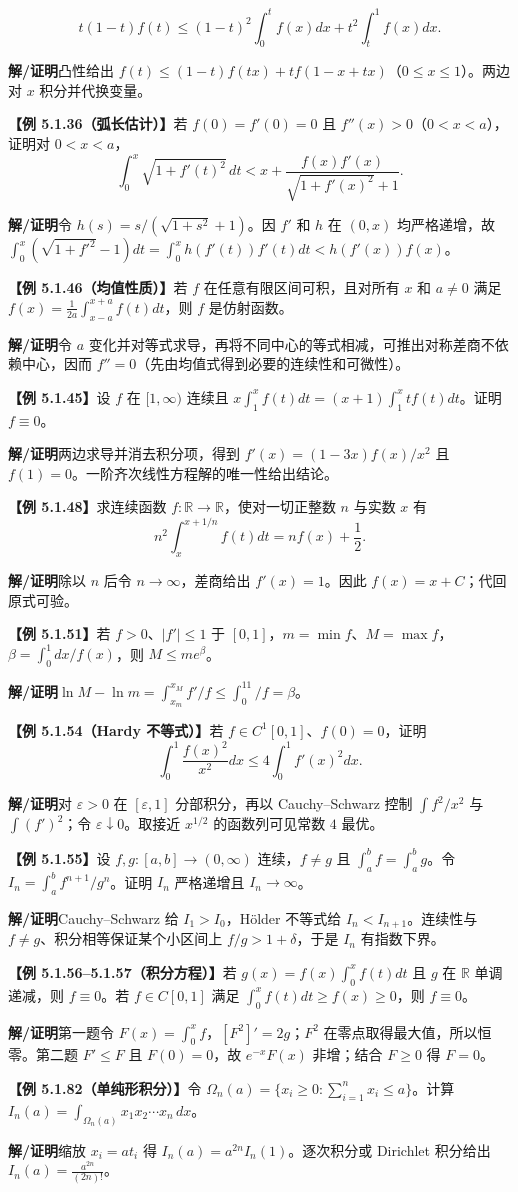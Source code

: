 \documentclass[UTF8,a4paper,11pt]{ctexart}
\newcommand{\ex}[1]{\par\medskip\noindent\textbf{【例 #1】}\;}
\newcommand{\sol}{\par\noindent\textbf{解/证明}\;}
\newcommand{\R}{\mathbb R}
\begin{document}
\[t(1-t)f(t)\le(1-t)^2\int_0^tf(x)dx+t^2\int_t^1f(x)dx.\]
\sol 凸性给出 $f(t)\le(1-t)f(tx)+tf(1-x+tx)$（$0\le x\le1$）。两边对 $x$ 积分并代换变量。
\ex{5.1.36（弧长估计）}若 $f(0)=f'(0)=0$ 且 $f''(x)>0$（$0<x<a$），证明对 $0<x<a$，
\[\int_0^x\sqrt{1+f'(t)^2}\,dt<x+\frac{f(x)f'(x)}{\sqrt{1+f'(x)^2}+1}.\]
\sol 令 $h(s)=s/(\sqrt{1+s^2}+1)$。因 $f'$ 和 $h$ 在 $(0,x)$ 均严格递增，故 $\int_0^x(\sqrt{1+f'^2}-1)dt=\int_0^xh(f'(t))f'(t)dt<h(f'(x))f(x)$。
\ex{5.1.46（均值性质）}若 $f$ 在任意有限区间可积，且对所有 $x$ 和 $a\ne0$ 满足 $f(x)=\frac1{2a}\int_{x-a}^{x+a}f(t)dt$，则 $f$ 是仿射函数。
\sol 令 $a$ 变化并对等式求导，再将不同中心的等式相减，可推出对称差商不依赖中心，因而 $f''=0$（先由均值式得到必要的连续性和可微性）。
\ex{5.1.45}设 $f$ 在 $[1,\infty)$ 连续且 $x\int_1^xf(t)dt=(x+1)\int_1^xtf(t)dt$。证明 $f\equiv0$。
\sol 两边求导并消去积分项，得到 $f'(x)=(1-3x)f(x)/x^2$ 且 $f(1)=0$。一阶齐次线性方程解的唯一性给出结论。
\ex{5.1.48}求连续函数 $f:\R\to\R$，使对一切正整数 $n$ 与实数 $x$ 有
\[n^2\int_x^{x+1/n}f(t)dt=nf(x)+\frac12.\]
\sol 除以 $n$ 后令 $n\to\infty$，差商给出 $f'(x)=1$。因此 $f(x)=x+C$；代回原式可验。
\ex{5.1.51}若 $f>0$、$|f'|\le1$ 于 $[0,1]$，$m=\min f$、$M=\max f$，$\beta=\int_0^1dx/f(x)$，则 $M\le me^\beta$。
\sol $\ln M-\ln m=\int_{x_m}^{x_M}f'/f\le\int_0^11/f=\beta$。
\ex{5.1.54（Hardy 不等式）}若 $f\in C^1[0,1]$、$f(0)=0$，证明
\[\int_0^1\frac{f(x)^2}{x^2}dx\le4\int_0^1f'(x)^2dx.\]
\sol 对 $\varepsilon>0$ 在 $[\varepsilon,1]$ 分部积分，再以 Cauchy--Schwarz 控制 $\int f^2/x^2$ 与 $\int(f')^2$；令 $\varepsilon\downarrow0$。取接近 $x^{1/2}$ 的函数列可见常数 $4$ 最优。
\ex{5.1.55}设 $f,g:[a,b]\to(0,\infty)$ 连续，$f\ne g$ 且 $\int_a^bf=\int_a^bg$。令 $I_n=\int_a^bf^{n+1}/g^n$。证明 $I_n$ 严格递增且 $I_n\to\infty$。
\sol Cauchy--Schwarz 给 $I_1>I_0$，Hölder 不等式给 $I_n<I_{n+1}$。连续性与 $f\ne g$、积分相等保证某个小区间上 $f/g>1+\delta$，于是 $I_n$ 有指数下界。
\ex{5.1.56--5.1.57（积分方程）}若 $g(x)=f(x)\int_0^xf(t)dt$ 且 $g$ 在 $\R$ 单调递减，则 $f\equiv0$。若 $f\in C[0,1]$ 满足 $\int_0^xf(t)dt\ge f(x)\ge0$，则 $f\equiv0$。
\sol 第一题令 $F(x)=\int_0^xf$，$[F^2]'=2g$；$F^2$ 在零点取得最大值，所以恒零。第二题 $F'\le F$ 且 $F(0)=0$，故 $e^{-x}F(x)$ 非增；结合 $F\ge0$ 得 $F=0$。
\ex{5.1.82（单纯形积分）}令 $\Omega_n(a)=\{x_i\ge0:\sum_{i=1}^nx_i\le a\}$。计算 $\displaystyle I_n(a)=\int_{\Omega_n(a)}x_1x_2\cdots x_n\,dx$。
\sol 缩放 $x_i=at_i$ 得 $I_n(a)=a^{2n}I_n(1)$。逐次积分或 Dirichlet 积分给出 $\displaystyle I_n(a)=\frac{a^{2n}}{(2n)!}$。
\end{document}
